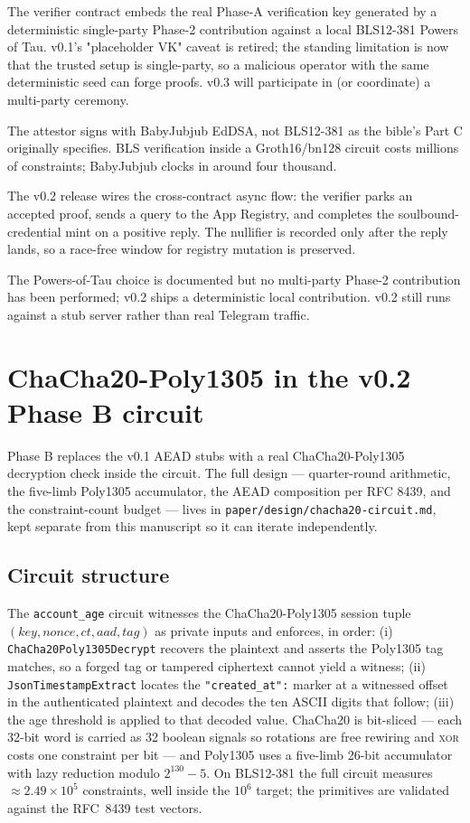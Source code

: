 \documentclass[11pt,a4paper]{article}
\begin{document}
The verifier contract embeds the real Phase-A verification key
generated by a deterministic single-party Phase-2 contribution
against a local BLS12-381 Powers of Tau. v0.1's "placeholder VK"
caveat is retired; the standing limitation is now that the trusted
setup is single-party, so a malicious operator with the same
deterministic seed can forge proofs. v0.3 will participate in (or
coordinate) a multi-party ceremony.

The attestor signs with BabyJubjub EdDSA, not BLS12-381 as the bible's
Part C originally specifies. BLS verification inside a Groth16/bn128
circuit costs millions of constraints; BabyJubjub clocks in around
four thousand.

The v0.2 release wires the cross-contract async flow: the verifier
parks an accepted proof, sends a query to the App Registry, and
completes the soulbound-credential mint on a positive reply. The
nullifier is recorded only after the reply lands, so a race-free
window for registry mutation is preserved.

The Powers-of-Tau choice is documented but no multi-party Phase-2
contribution has been performed; v0.2 ships a deterministic local
contribution. v0.2 still runs against a stub server rather than real
Telegram traffic.

\section{ChaCha20-Poly1305 in the v0.2 Phase B circuit}\label{sec:chacha}

Phase B replaces the v0.1 AEAD stubs with a real
ChaCha20-Poly1305 decryption check inside the circuit. The full
design --- quarter-round arithmetic, the five-limb Poly1305
accumulator, the AEAD composition per RFC 8439, and the
constraint-count budget --- lives in
\texttt{paper/design/chacha20-circuit.md}, kept separate from this
manuscript so it can iterate independently.

\subsection{Circuit structure}

The \texttt{account\_age} circuit witnesses the ChaCha20-Poly1305
session tuple $(\mathit{key}, \mathit{nonce}, \mathit{ct},
\mathit{aad}, \mathit{tag})$ as private inputs and enforces, in
order: (i) \texttt{ChaCha20Poly1305Decrypt} recovers the plaintext
and asserts the Poly1305 tag matches, so a forged tag or tampered
ciphertext cannot yield a witness; (ii) \texttt{JsonTimestampExtract}
locates the \texttt{"created\_at":} marker at a witnessed offset in
the authenticated plaintext and decodes the ten ASCII digits that
follow; (iii) the age threshold is applied to that decoded value.
ChaCha20 is bit-sliced --- each 32-bit word is carried as 32 boolean
signals so rotations are free rewiring and \textsc{xor} costs one
constraint per bit --- and Poly1305 uses a five-limb 26-bit
accumulator with lazy reduction modulo $2^{130}-5$. On BLS12-381 the
full circuit measures $\approx\!2.49\times10^{5}$ constraints, well
inside the $10^{6}$ target; the primitives are validated against the
RFC~8439 test vectors.
\end{document}
